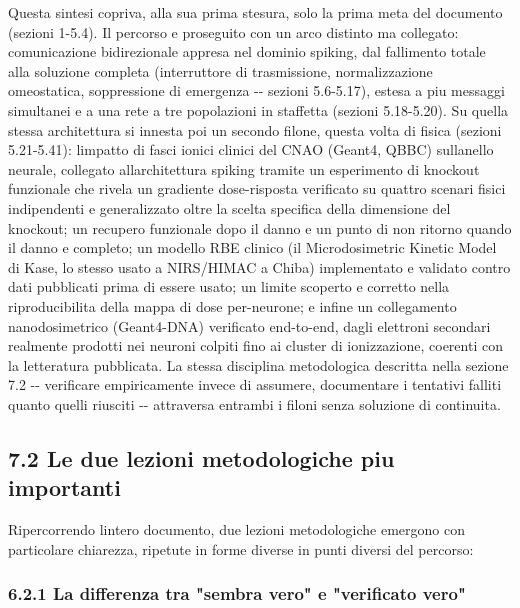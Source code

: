 \documentclass[
  italian,
]{article}
\begin{document}
Questa sintesi copriva, alla sua prima stesura, solo la prima meta\textquotesingle{} del documento (sezioni 1-5.4). Il percorso e\textquotesingle{} proseguito con un arco distinto ma collegato: comunicazione bidirezionale appresa nel dominio spiking, dal fallimento totale alla soluzione completa (interruttore di trasmissione, normalizzazione omeostatica, soppressione di emergenza -\/- sezioni 5.6-5.17), estesa a piu\textquotesingle{} messaggi simultanei e a una rete a tre popolazioni in staffetta (sezioni 5.18-5.20). Su quella stessa architettura si innesta poi un secondo filone, questa volta di fisica (sezioni 5.21-5.41): l\textquotesingle impatto di fasci ionici clinici del CNAO (Geant4, QBBC) sull\textquotesingle anello neurale, collegato all\textquotesingle architettura spiking tramite un esperimento di knockout funzionale che rivela un gradiente dose-risposta verificato su quattro scenari fisici indipendenti e generalizzato oltre la scelta specifica della dimensione del knockout; un recupero funzionale dopo il danno e un punto di non ritorno quando il danno e\textquotesingle{} completo; un modello RBE clinico (il Microdosimetric Kinetic Model di Kase, lo stesso usato a NIRS/HIMAC a Chiba) implementato e validato contro dati pubblicati prima di essere usato; un limite scoperto e corretto nella riproducibilita\textquotesingle{} della mappa di dose per-neurone; e infine un collegamento nanodosimetrico (Geant4-DNA) verificato end-to-end, dagli elettroni secondari realmente prodotti nei neuroni colpiti fino ai cluster di ionizzazione, coerenti con la letteratura pubblicata. La stessa disciplina metodologica descritta nella sezione 7.2 -\/- verificare empiricamente invece di assumere, documentare i tentativi falliti quanto quelli riusciti -\/- attraversa entrambi i filoni senza soluzione di continuita\textquotesingle.

\subsection{7.2 Le due lezioni metodologiche piu\textquotesingle{} importanti}\label{le-due-lezioni-metodologiche-piu-importanti}

Ripercorrendo l\textquotesingle intero documento, due lezioni metodologiche emergono con particolare chiarezza, ripetute in forme diverse in punti diversi del percorso:

\subsubsection{6.2.1 La differenza tra "sembra vero" e "verificato vero"}\label{la-differenza-tra-sembra-vero-e-verificato-vero}
\end{document}
